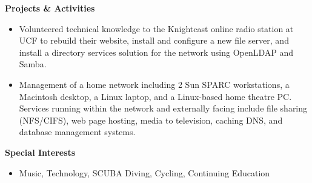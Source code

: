 \documentclass[10pt,oneside]{article}
\newenvironment{ressection}[1]{
	\vspace{4pt}
	\textbf{\selectfont\normalsize#1}
	\begin{itemize}
	\vspace{3pt}
}{
	\end{itemize}
}
\newcommand{\resitem}[1]{
	\vspace{-4pt}
	\item \begin{flushleft} #1 \end{flushleft}
}
\begin{document}

\begin{ressection}{Projects \& Activities}

	\resitem{Volunteered technical knowledge to the Knightcast online radio station at UCF to rebuild their website, install and configure a new file server, and install a directory services solution for the network using OpenLDAP and Samba.}
	
	\resitem{Management of a home network including 2 Sun SPARC workstations, a Macintosh desktop, a Linux laptop, and a Linux-based home theatre PC.  Services running within the network and externally facing include file sharing (NFS/CIFS), web page hosting, media to television, caching DNS, and database management systems.}

\end{ressection}


\begin{ressection}{Special Interests}

	\resitem{Music, Technology, SCUBA Diving, Cycling, Continuing Education}

\end{ressection}

\end{document}
